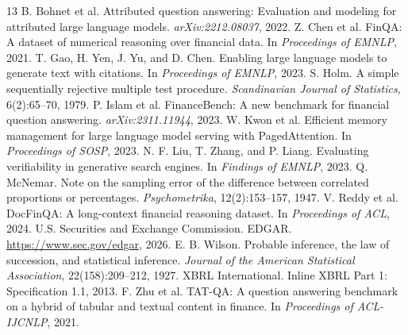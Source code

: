 \documentclass[11pt]{article}
\begin{document}
\begin{thebibliography}{13}
 B. Bohnet et al. Attributed question answering: Evaluation and modeling for attributed large language models. \emph{arXiv:2212.08037}, 2022.
 Z. Chen et al. FinQA: A dataset of numerical reasoning over financial data. In \emph{Proceedings of EMNLP}, 2021.
 T. Gao, H. Yen, J. Yu, and D. Chen. Enabling large language models to generate text with citations. In \emph{Proceedings of EMNLP}, 2023.
 S. Holm. A simple sequentially rejective multiple test procedure. \emph{Scandinavian Journal of Statistics}, 6(2):65--70, 1979.
 P. Islam et al. FinanceBench: A new benchmark for financial question answering. \emph{arXiv:2311.11944}, 2023.
 W. Kwon et al. Efficient memory management for large language model serving with PagedAttention. In \emph{Proceedings of SOSP}, 2023.
 N. F. Liu, T. Zhang, and P. Liang. Evaluating verifiability in generative search engines. In \emph{Findings of EMNLP}, 2023.
 Q. McNemar. Note on the sampling error of the difference between correlated proportions or percentages. \emph{Psychometrika}, 12(2):153--157, 1947.
 V. Reddy et al. DocFinQA: A long-context financial reasoning dataset. In \emph{Proceedings of ACL}, 2024.
 U.S. Securities and Exchange Commission. EDGAR. \url{https://www.sec.gov/edgar}, 2026.
 E. B. Wilson. Probable inference, the law of succession, and statistical inference. \emph{Journal of the American Statistical Association}, 22(158):209--212, 1927.
 XBRL International. Inline XBRL Part 1: Specification 1.1, 2013.
 F. Zhu et al. TAT-QA: A question answering benchmark on a hybrid of tabular and textual content in finance. In \emph{Proceedings of ACL-IJCNLP}, 2021.
\end{thebibliography}

\clearpage
\appendix
\end{document}
